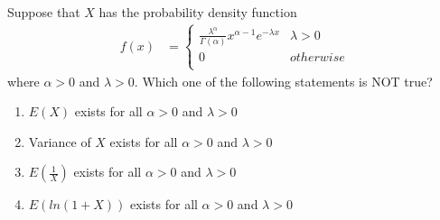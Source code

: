 \documentclass[journal,12pt,twocolumn]{IEEEtran}
\theoremstyle{remark}
\begin{document}



\maketitle

\newpage


\bigskip

\renewcommand{\thefigure}{\theenumi}
\renewcommand{\thetable}{\theenumi}

Suppose that $X$ has the probability density function
\begin{align}
f(x)&=
\begin{cases}
\frac{\lambda^{\alpha}}{\Gamma(\alpha)}x^{\alpha - 1} e^{-\lambda x} & \lambda > 0\\
0 & otherwise\\
\end{cases}
\end{align}
where $\alpha > 0$ and $\lambda > 0$. Which one of the following statements is NOT true?
\begin{enumerate}
\item $E(X)$ exists for all $\alpha > 0 $ and $ \lambda > 0$
\item Variance of $X$ exists for all $\alpha > 0$ and $\lambda > 0$
\item $E(\frac{1}{X})$ exists for all $\alpha > 0$ and $\lambda > 0$
\item $E(ln(1+X))$ exists for all $\alpha > 0$ and $\lambda > 0$
\end{enumerate}
\solution
\end{document}

